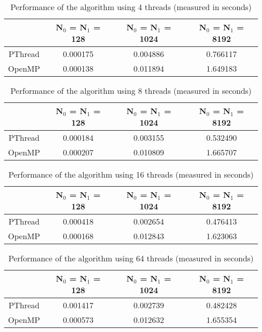 \documentclass[10pt,twocolumn]{witseiepaper}
\begin{document}
\begin{table}[h]
\centering
\caption{Performance of the algorithm using 4 threads (measured in seconds)}
\begin{tabular}{|c|c|c|c|}
	\hline 
	 & N$_{0}$ = N$_{1}$ = 128 &  N$_{0}$ = N$_{1}$ = 1024 & N$_{0}$ = N$_{1}$ = 8192 \\ 
	\hline 
	PThread & 0.000175 & 0.004886 & 0.766117 \\ 
	\hline 
	OpenMP & 0.000138 & 0.011894 & 1.649183 \\ 
	\hline 
\end{tabular}
\label{tab:2} 
\end{table} 

\begin{table}[h]
		\centering
\caption{Performance of the algorithm using 8 threads (measured in seconds)}
\begin{tabular}{|c|c|c|c|}
	\hline 
	 & N$_{0}$ = N$_{1}$ = 128 &  N$_{0}$ = N$_{1}$ = 1024 & N$_{0}$ = N$_{1}$ = 8192 \\ 
	\hline 
	PThread & 0.000184 & 0.003155 & 0.532490 \\ 
	\hline 
	OpenMP & 0.000207 & 0.010809 & 1.665707 \\ 
	\hline 
\end{tabular} 
\label{tab:3} 
\end{table}

\begin{table}[h]
		\centering
	\caption{Performance of the algorithm using 16 threads (measured in seconds)}
\begin{tabular}{|c|c|c|c|}
	\hline 
	 & N$_{0}$ = N$_{1}$ = 128 &  N$_{0}$ = N$_{1}$ = 1024 & N$_{0}$ = N$_{1}$ = 8192 \\ 
	\hline 
	PThread & 0.000418 & 0.002654 & 0.476413 \\ 
	\hline 
	OpenMP & 0.000168 & 0.012843 & 1.623063 \\ 
	\hline 
\end{tabular} 
\label{tab:4} 
\end{table}

\begin{table}[h]
		\centering
	\caption{Performance of the algorithm using 64 threads (measured in seconds)}
\begin{tabular}{|c|c|c|c|}
	\hline 
	 & N$_{0}$ = N$_{1}$ = 128 &  N$_{0}$ = N$_{1}$ = 1024 & N$_{0}$ = N$_{1}$ = 8192 \\ 
	\hline 
	PThread & 0.001417 & 0.002739 & 0.482428 \\ 
	\hline 
	OpenMP & 0.000573 & 0.012632 & 1.655354 \\ 
	\hline 
\end{tabular} 
\label{tab:5} 
\end{table}
\end{document}
